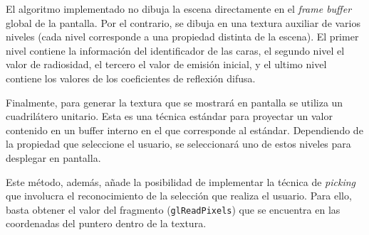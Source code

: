 El algoritmo implementado no dibuja la escena directamente en el \textit{frame buffer} global de la pantalla. Por el contrario, se dibuja en una textura auxiliar de varios niveles (cada nivel corresponde a una propiedad distinta de la escena). El primer nivel contiene la información del identificador de las caras, el segundo nivel el valor de radiosidad, el tercero el valor de emisión inicial, y el ultimo nivel contiene los valores de los coeficientes de reflexión difusa.

Finalmente, para generar la textura que se mostrará en pantalla se utiliza un cuadrilátero unitario. Esta es una técnica estándar para proyectar un valor contenido en un buffer interno en el que corresponde al estándar. Dependiendo de la propiedad que seleccione el usuario, se seleccionará uno de estos niveles para desplegar en pantalla.

Este método, además, añade la posibilidad de implementar la técnica de \textit{picking} que involucra el reconocimiento de la selección que realiza el usuario. Para ello, basta obtener el valor del fragmento (\verb|glReadPixels|) que se encuentra en las coordenadas del puntero dentro de la textura.

